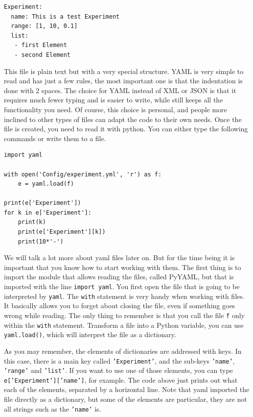 \begin{verbatim}
Experiment:
  name: This is a test Experiment
  range: [1, 10, 0.1]
  list:
   - first Element
   - second Element
\end{verbatim}

This file is plain text but with a very special structure. {YAML} is
very simple to read and has just a few rules, the most important one is
that the indentation is done with 2 spaces. The choice for {YAML}
instead of {XML} or {JSON} is that it requires much fewer typing and is
easier to write, while still keeps all the functionality you need. Of
course, this choice is personal, and people more inclined to other types
of files can adapt the code to their own needs. Once the file is
created, you need to read it with python. You can either type the
following commands or write them to a file.

\begin{verbatim}
import yaml

with open('Config/experiment.yml', 'r') as f:
    e = yaml.load(f)

print(e['Experiment'])
for k in e['Experiment']:
    print(k)
    print(e['Experiment'][k])
    print(10*'-')
\end{verbatim}

We will talk a lot more about yaml files later on. But for the time
being it is important that you know how to start working with them. The
first thing is to import the module that allows reading the files,
called PyYAML, but that is imported with the line \texttt{import yaml}.
You first open the file that is going to be interpreted by
\texttt{yaml}. The \texttt{with} statement is very handy when working
with files. It basically allows you to forget about closing the file,
even if something goes wrong while reading. The only thing to remember
is that you call the file \texttt{f} only within the \texttt{with}
statement. Transform a file into a Python variable, you can use
\texttt{yaml.load()}, which will interpret the file as a dictionary.

As you may remember, the elements of dictionaries are addressed with
keys. In this case, there is a main key called
\texttt{'Experiment'}, and the
sub-keys \texttt{'name'},
\texttt{'range'} and
\texttt{'list'}. If you want to use
one of those elements, you can type
\texttt{e['Experiment']['name']},
for example. The code above just prints out what each of the elements,
separated by a horizontal line. Note that yaml imported the file
directly as a dictionary, but some of the elements are particular, they
are not all strings such as the
\texttt{'name'} is.


